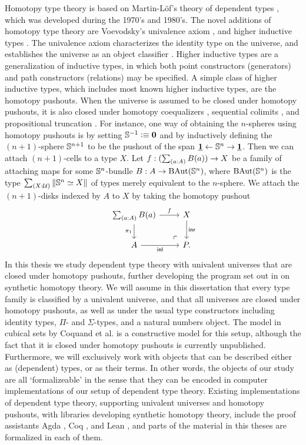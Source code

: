 Homotopy type theory is based on Martin-L\"of's theory of dependent types \cite{MartinLof1984}, which
was developed during the 1970's and 1980's.
The novel additions of homotopy type theory are Voevodsky's univalence axiom \cite{Voevodsky06,Voevodsky10},
and higher inductive types \cite{Lumsdaine11Blog,Shulman11Blog,hottbook}. The univalence axiom characterizes the identity
type on the universe, and establishes the universe as an object classifier \cite{RijkeSpitters}.
Higher inductive types are a generalization of inductive types, in which both
point constructors (generators) and path constructors (relations) may be specified.
A simple class of higher inductive types, which includes most known higher inductive
types, are the homotopy pushouts. When the universe is assumed to be closed
under homotopy pushouts, it is also closed under homotopy coequalizers \cite{hottbook}, 
sequential colimits \cite{hottbook}, and propositional truncation \cite{vanDoorn2016}.
For instance, one way of obtaining the $n$-spheres \cite{Lumsdaine12Blog} using homotopy pushouts is by setting $\mathbb{S}^{-1}\vcentcolon\equiv\mathbf{0}$ and
by inductively defining the $(n+1)$-sphere $\mathbb{S}^{n+1}$ to be the pushout
of the span $\underline{\mathbf{1}} \leftarrow\mathbb{S}^{n}\rightarrow\underline{\mathbf{1}}$. 
Then we can attach $(n+1)$-cells to a type $X$.
Let $f:(\sm{a:A}B(a))\to X$ be a family of attaching maps
for some $\mathbb{S}^{n}$-bundle $B:A\to\mathrm{BAut}(\mathbb{S}^{n})$, where $\mathrm{BAut}(\mathbb{S}^{n})$ is the type $\sm{X:\UU}\brck{\eqv{\sphere{n}}{X}}$ of types merely equivalent to the $n$-sphere. We
attach the $(n+1)$-disks indexed by $A$ to $X$ by taking the homotopy pushout
\begin{equation*}
\begin{tikzcd}
\sm{a:A}B(a) \arrow[r,"f"] \arrow[d,swap,"\pi_1"]  & X \arrow[d,"\inr"] \\
A \arrow[r,swap,"\inl"] & P. \arrow[ul,phantom,very near start,"\ulcorner"]
\end{tikzcd}
\end{equation*}
In this thesis we study dependent type theory with univalent universes that are closed under homotopy pushouts, further developing the program set out in \cite{hottbook} on synthetic homotopy theory. We will assume in this dissertation that every type family is classified by a univalent universe, and that all universes are closed under homotopy pushouts, as well as under the usual type constructors including identity types, $\Pi$- and $\Sigma$-types, and a natural numbers object. The model in cubical sets by Coquand et al. \cite{BezemCoquandHuber} is a constructive model for this setup, although the fact that it is closed under homotopy pushouts is currently unpublished. Furthermore, we will exclusively work with objects that can be described either as (dependent) types, or as their terms. In other words, the objects of our study are all `formalizeable' in the sense that they can be encoded in computer implementations of our setup of dependent type theory. Existing implementations of dependent type theory, supporting univalent universes and homotopy pushouts, with libraries developing synthetic homotopy theory, include the proof assistants Agda \cite{agda}, Coq \cite{Coq,hcoq}, and Lean \cite{vDvRB2017HoTTLean}, and parts of the material in this theses are formalized in each of them. 

